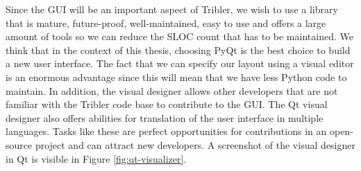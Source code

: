 Since the GUI will be an important aspect of Tribler, we wish to use a library that is mature, future-proof, well-maintained, easy to use and offers a large amount of tools so we can reduce the SLOC count that has to be maintained. We think that in the context of this thesis, choosing PyQt is the best choice to build a new user interface. The fact that we can specify our layout using a visual editor is an enormous advantage since this will mean that we have less Python code to maintain. In addition, the visual designer allows other developers that are not familiar with the Tribler code base to contribute to the GUI. The Qt visual designer also offers abilities for translation of the user interface in multiple languages. Tasks like these are perfect opportunities for contributions in an open-source project and can attract new developers. A screenshot of the visual designer in Qt is visible in Figure \ref{fig:qt-visualizer}.


